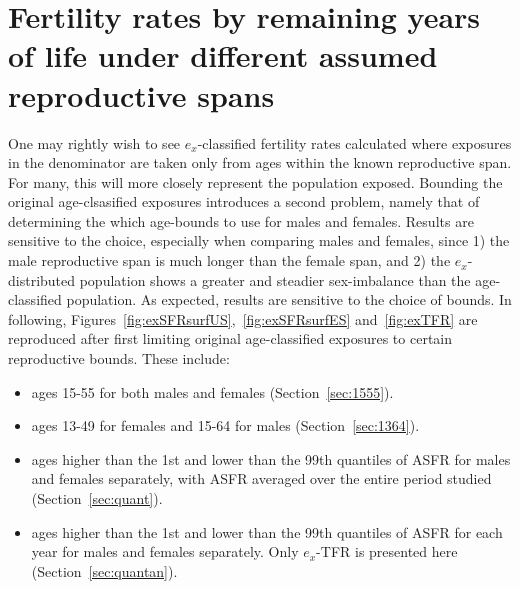 % 

\chapter{Fertility rates by remaining years of life under different assumed
reproductive spans}
\label{Appendix:reprospans}
One may rightly wish to see $e_x$-classified fertility rates calculated where
exposures in the denominator are taken only from ages within the known
reproductive span. For many, this will more closely represent the population exposed. Bounding the
original age-clsasified exposures introduces a second problem, namely that of
determining the which age-bounds to use for males and females. Results are
sensitive to the choice, especially when comparing males and females, since 1)
the male reproductive span is much longer than the female span, and 2) the
$e_x$-distributed population shows a greater and steadier sex-imbalance than the
age-classified population. As expected, results are sensitive to the choice of
bounds. In following, Figures~\ref{fig:exSFRsurfUS},~\ref{fig:exSFRsurfES}
and~\ref{fig:exTFR} are reproduced after first limiting original
age-classified exposures to certain reproductive bounds. These include:

\begin{itemize}
  \item ages 15-55 for both males and females (Section~\ref{sec:1555}).
  \item ages 13-49 for females and 15-64 for males (Section~\ref{sec:1364}).
  \item ages higher than the 1st and lower than the 99th
  quantiles of ASFR for males and females separately, with ASFR averaged over the entire period
  studied (Section~\ref{sec:quant}).
  \item ages higher than the 1st and lower than the
  99th quantiles of ASFR for each year for males and females separately. Only
  $e_x$-TFR is presented here (Section~\ref{sec:quantan}).
\end{itemize}

\pagebreak

